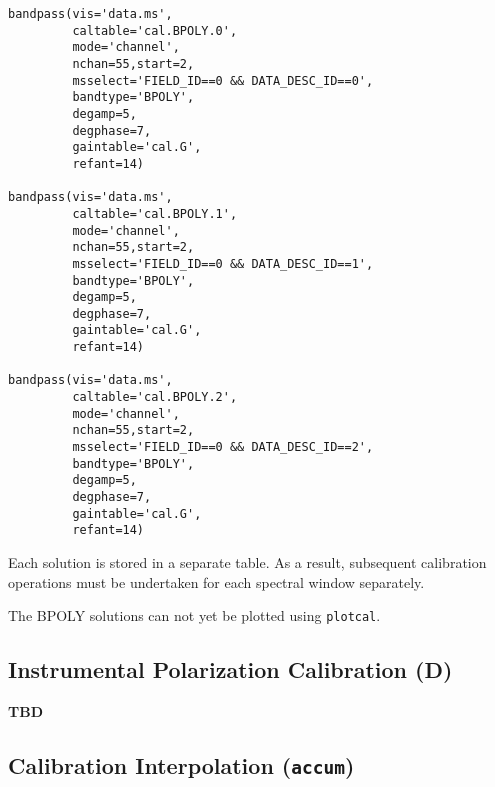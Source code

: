 \small
\begin{verbatim}
bandpass(vis='data.ms',            
         caltable='cal.BPOLY.0',
         mode='channel',
         nchan=55,start=2,
         msselect='FIELD_ID==0 && DATA_DESC_ID==0', 
         bandtype='BPOLY',
         degamp=5,
         degphase=7, 
         gaintable='cal.G',
         refant=14)

bandpass(vis='data.ms',            
         caltable='cal.BPOLY.1',
         mode='channel',
         nchan=55,start=2,
         msselect='FIELD_ID==0 && DATA_DESC_ID==1', 
         bandtype='BPOLY',
         degamp=5,
         degphase=7, 
         gaintable='cal.G',
         refant=14)

bandpass(vis='data.ms',            
         caltable='cal.BPOLY.2',
         mode='channel',
         nchan=55,start=2,
         msselect='FIELD_ID==0 && DATA_DESC_ID==2', 
         bandtype='BPOLY',
         degamp=5,
         degphase=7, 
         gaintable='cal.G',
         refant=14)
\end{verbatim}
\normalsize

Each solution is stored in a separate table.  As a result, subsequent
calibration operations must be undertaken for each spectral window
separately.

The BPOLY solutions can not yet be plotted using {\tt plotcal}.

\subsection{Instrumental Polarization Calibration (D)}
\label{subsection:synth.pol.cal}

{\bf TBD}

\subsection{Calibration Interpolation ({\tt accum})}
\label{subsection:synth.cal.interp}

